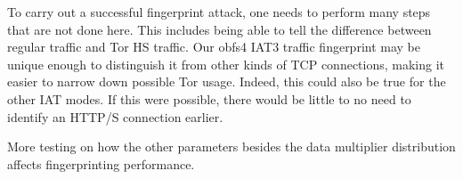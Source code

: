 \documentclass[11pt]{article}
\begin{document}
To carry out a successful fingerprint attack, one needs to perform many steps that are not done here. This includes being able to tell the difference between regular traffic and Tor HS traffic. Our obfs4 IAT3 traffic fingerprint may be unique enough to distinguish it from other kinds of TCP connections, making it easier to narrow down possible Tor usage. Indeed, this could also be true for the other IAT modes. If this were possible, there would be little to no need to identify an HTTP/S connection earlier.

More testing on how the other parameters besides the data multiplier distribution affects fingerprinting performance.

\printbibliography
\end{document}
